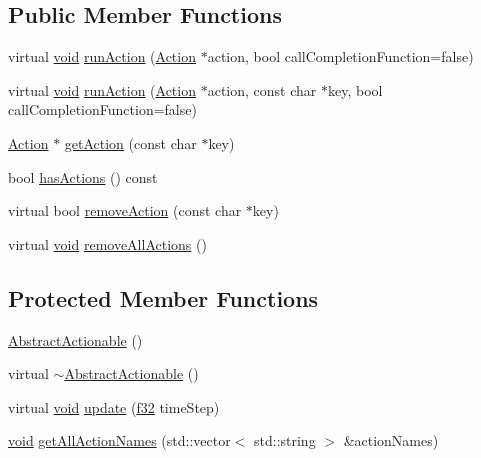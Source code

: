 \subsection*{Public Member Functions}
\begin{DoxyCompactItemize}
\item 
virtual \mbox{\hyperlink{_thread_8h_af1e856da2e658414cb2456cb6f7ebc66}{void}} \mbox{\hyperlink{classnjli_1_1_abstract_actionable_af2020b25504138eb95c993b3a09c6500}{run\+Action}} (\mbox{\hyperlink{classnjli_1_1_action}{Action}} $\ast$action, bool call\+Completion\+Function=false)
\item 
virtual \mbox{\hyperlink{_thread_8h_af1e856da2e658414cb2456cb6f7ebc66}{void}} \mbox{\hyperlink{classnjli_1_1_abstract_actionable_a8ad2ebd2c3a7abb313602866259fb98c}{run\+Action}} (\mbox{\hyperlink{classnjli_1_1_action}{Action}} $\ast$action, const char $\ast$key, bool call\+Completion\+Function=false)
\item 
\mbox{\hyperlink{classnjli_1_1_action}{Action}} $\ast$ \mbox{\hyperlink{classnjli_1_1_abstract_actionable_a2e853aeb7805f7fb878acc2f4ebafadb}{get\+Action}} (const char $\ast$key)
\item 
bool \mbox{\hyperlink{classnjli_1_1_abstract_actionable_a237eba6122f8505a04df9bcc0cd431af}{has\+Actions}} () const
\item 
virtual bool \mbox{\hyperlink{classnjli_1_1_abstract_actionable_a902395a20ef04482b15e7a65c0be4bad}{remove\+Action}} (const char $\ast$key)
\item 
virtual \mbox{\hyperlink{_thread_8h_af1e856da2e658414cb2456cb6f7ebc66}{void}} \mbox{\hyperlink{classnjli_1_1_abstract_actionable_a758cc11b09194399de63537e0f7e1485}{remove\+All\+Actions}} ()
\end{DoxyCompactItemize}
\subsection*{Protected Member Functions}
\begin{DoxyCompactItemize}
\item 
\mbox{\hyperlink{classnjli_1_1_abstract_actionable_a14bdb9bfc024571d6989763629625949}{Abstract\+Actionable}} ()
\item 
virtual \mbox{\hyperlink{classnjli_1_1_abstract_actionable_a649739eb41be60afdcf18d7fe0d25fff}{$\sim$\+Abstract\+Actionable}} ()
\item 
virtual \mbox{\hyperlink{_thread_8h_af1e856da2e658414cb2456cb6f7ebc66}{void}} \mbox{\hyperlink{classnjli_1_1_abstract_actionable_aab364e6f121a457e33a61850300c2d7b}{update}} (\mbox{\hyperlink{_util_8h_a5f6906312a689f27d70e9d086649d3fd}{f32}} time\+Step)
\item 
\mbox{\hyperlink{_thread_8h_af1e856da2e658414cb2456cb6f7ebc66}{void}} \mbox{\hyperlink{classnjli_1_1_abstract_actionable_a9df58912375974fd1e5da088e4d4225d}{get\+All\+Action\+Names}} (std\+::vector$<$ std\+::string $>$ \&action\+Names)
\end{DoxyCompactItemize}
